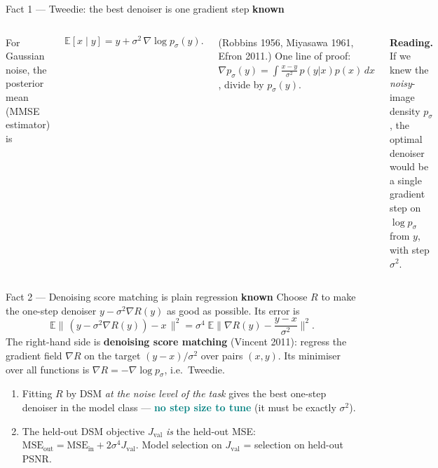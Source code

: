 \documentclass[10pt,aspectratio=169]{beamer}
\newcommand{\EXP}[1]{\textcolor{teal}{\textbf{#1}}}
\newcommand{\E}{\mathbb{E}}
\newcommand{\tagold}{\colorbox{slate!15}{\scriptsize\textcolor{slate}{\textbf{known}}}}
\begin{document}
\begin{frame}{Fact 1 --- Tweedie: the best denoiser is one gradient step \hfill\tagold}
\begin{columns}[T]
For Gaussian noise, the posterior mean (MMSE estimator) is
\begin{keybox}
\[
\E[x\mid y]=y+\sigma^2\,\nabla\log p_\sigma(y).
\]
\end{keybox}
\small (Robbins 1956, Miyasawa 1961, Efron 2011.) One line of proof:
$\nabla p_\sigma(y)=\int \frac{x-y}{\sigma^2}\,p(y|x)p(x)\,dx$, divide by $p_\sigma(y)$.

\medskip
\textbf{Reading.} If we knew the \emph{noisy}-image density $p_\sigma$, the optimal
denoiser would be a single gradient step on $\log p_\sigma$ from $y$, with step $\sigma^2$.
\end{columns}
\end{frame}

\begin{frame}{Fact 2 --- Denoising score matching is plain regression \hfill\tagold}
Choose $R$ to make the one-step denoiser $y-\sigma^2\nabla R(y)$ as good as possible.
Its error is
\[
\E\big\|\,(y-\sigma^2\nabla R(y))-x\,\big\|^2
=\sigma^4\;\E\Big\|\nabla R(y)-\frac{y-x}{\sigma^2}\Big\|^2 .
\]
The right-hand side is \textbf{denoising score matching} (Vincent 2011): regress the gradient
field $\nabla R$ on the target $(y-x)/\sigma^2$ over pairs $(x,y)$. Its minimiser over all
functions is $\nabla R=-\nabla\log p_\sigma$, i.e.\ Tweedie.

\begin{keybox}[title={Two consequences we use}]
\begin{enumerate}
\item Fitting $R$ by DSM \emph{at the noise level of the task} gives the best one-step denoiser
      in the model class --- \EXP{no step size to tune} (it must be exactly $\sigma^2$).
\item The held-out DSM objective $J_{\text{val}}$ \emph{is} the held-out MSE:
      \quad $\text{MSE}_{\text{out}}=\text{MSE}_{\text{in}}+2\sigma^4 J_{\text{val}}$.
      Model selection on $J_{\text{val}}$ = selection on held-out PSNR.
\end{enumerate}
\end{keybox}
\end{frame}
\end{document}
